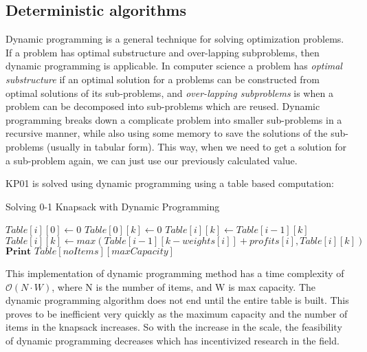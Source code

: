 \documentclass[titlepage]{article}
\begin{document}
\subsection*{Deterministic algorithms}
Dynamic programming is a general technique for solving optimization problems. If a problem has optimal substructure and over-lapping subproblems, then dynamic programming is applicable. In computer science 
a problem has \emph{optimal substructure} if an optimal solution for a problems can be constructed from optimal solutions of its sub-problems, and \emph{over-lapping subproblems} is when a problem can be decomposed into sub-problems which are reused. Dynamic programming breaks down a complicate problem into smaller sub-problems in a recursive manner, while also using some memory to save the solutions of the sub-problems (usually in tabular form). This way, when we need to get a solution for a sub-problem again, we can just use our previously calculated value. 

KP01 is solved using dynamic programming using a table based computation:

\begin{breakablealgorithm}
\caption{Solving 0-1 Knapsack with Dynamic Programming}\label{dp}
    \begin{algorithmic}[1]
         \Comment{\textcolor{blue}{If no items, then profit = 0}}
            \State $Table[i][0] \gets 0 $ 
        \EndFor
         \Comment{\textcolor{blue}{If no capacity, then profit = 0}}
            \State $Table[0][k] \gets 0 $
        \EndFor
                \State $Table[i][k] \gets Table[i-1][k]$  
                    \State $Table[i][k] \gets max(Table[i-1][k-weights[i]] + profits[i], Table[i][k]) $
                \EndIf
            \EndFor
        \EndFor
        \State $\textbf{Print } Table[noItems][maxCapacity] $
    \end{algorithmic}
\end{breakablealgorithm}

\vskip 0.5cm

This implementation of dynamic programming method has a time complexity of $\mathcal{O}(N\cdot W)$, where N is the number of items, and W is max capacity. The dynamic programming algorithm does not end until the entire table is built. This proves to be inefficient very quickly as the maximum capacity and the number of items in the knapsack increases. So with the increase in the scale, the feasibility of dynamic programming decreases which has incentivized research in the field.
\end{document}
